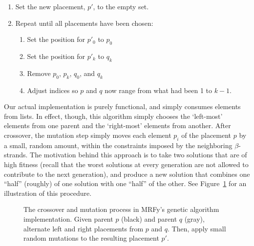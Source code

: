\documentclass[blockstyle,times,preprint]{sigplanconf}
\begin{document}
\begin{enumerate}
  \item Set the new placement, $p'$, to the empty set.
  \item Repeat until all placements have been chosen:
  \begin{enumerate}
    \item Set the position for $p'_{0}$ to $p_{0}$
    \item Set the position for $p'_{k}$ to $q_{k}$
    \item Remove $p_{0}$, $p_{k}$, $q_{0}$, and $q_{k}$
    \item Adjust indices so $p$ and $q$ now range from what had been 1 to $k-1$.
  \end{enumerate}
\end{enumerate}

Our actual implementation is purely functional, and simply consumes elements 
from lists.
In effect, though, this algorithm simply chooses the `left-most' elements from 
one parent and the `right-most' elements from another.
After crossover, the mutation step simply moves each element $p_{i}$ of the
placement $p$ by a small, random amount, within the constraints imposed by the
neighboring $\beta$-strands.
The motivation behind this approach is to take two solutions that are of high
fitness (recall that the worst solutions at every generation are not allowed
to contribute to the next generation), and produce a new solution that combines
one ``half'' (roughly) of one solution with one ``half'' of the other.
See Figure~\ref{crossover} for an illustration of this procedure.

\begin{figure}[htb!]
\begin{center}
   \caption{The crossover and mutation process in MRFy's genetic algorithm 
   implementation.
   Given parent $p$ (black) and parent $q$ (gray), alternate left and right
    placements from $p$ and $q$.
    Then, apply small random mutations to the resulting placement $p'$.}
   \label{crossover}
 \end{center}
\end{figure}
\end{document}
